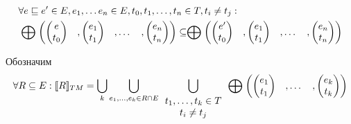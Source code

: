 \begin{equation}
\label{cpa_tm_abstract_domain_2}
\begin{aligned}
& \forall e \sqsubseteq e' \in E, e_1, \dots e_n \in E, t_0,t_1,\dots,t_n \in T, t_i \neq t_j : \\
& \mathrel{\bigoplus} 
\begin{pmatrix}
\begin{pmatrix}
e \\
t_0 
\end{pmatrix}& ,
\begin{pmatrix}
e_1 \\
t_1 
\end{pmatrix}&,
\dots& ,
\begin{pmatrix}
e_n \\
t_n 
\end{pmatrix}
\end{pmatrix} 
\subseteq \mathrel{\bigoplus}
\begin{pmatrix}
\begin{pmatrix}
e' \\
t_0 
\end{pmatrix}& ,
\begin{pmatrix}
e_1 \\
t_1 
\end{pmatrix}&,
\dots& ,
\begin{pmatrix}
e_n \\
t_n 
\end{pmatrix}
\end{pmatrix} 
\end{aligned}
\end{equation}

Обозначим
\begin{equation}
\begin{aligned}
\forall R\subseteq E: [\![ R ]\!]_{TM} = 
\bigcup_{k}
{\bigcup_{e_1,\dots,e_k \in R \cap E}{
\bigcup_{
\begin{array}{c}
t_1,\dots,t_k \in T \\
t_i \neq t_j
\end{array}
} {
\mathrel{\bigoplus}
\begin{pmatrix}
\begin{pmatrix}
e_1 \\
t_1 
\end{pmatrix}&,
\dots& ,
\begin{pmatrix}
e_k \\
t_k 
\end{pmatrix}
\end{pmatrix} 
}
}
}
\end{aligned}
\end{equation}

